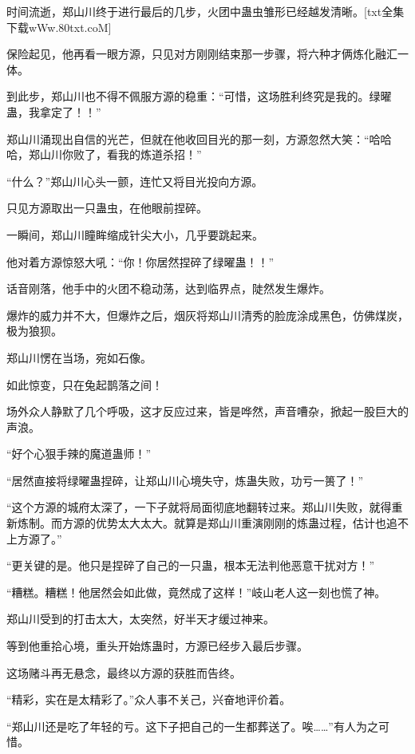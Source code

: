 
\begin{this_body}

时间流逝，郑山川终于进行最后的几步，火团中蛊虫雏形已经越发清晰。[txt全集下载wWw.80txt.coM]

保险起见，他再看一眼方源，只见对方刚刚结束那一步骤，将六种才俩炼化融汇一体。

到此步，郑山川也不得不佩服方源的稳重：“可惜，这场胜利终究是我的。绿曜蛊，我拿定了！！”

郑山川涌现出自信的光芒，但就在他收回目光的那一刻，方源忽然大笑：“哈哈哈，郑山川你败了，看我的炼道杀招！”

“什么？”郑山川心头一颤，连忙又将目光投向方源。

只见方源取出一只蛊虫，在他眼前捏碎。

一瞬间，郑山川瞳眸缩成针尖大小，几乎要跳起来。

他对着方源惊怒大吼：“你！你居然捏碎了绿曜蛊！！”

话音刚落，他手中的火团不稳动荡，达到临界点，陡然发生爆炸。

爆炸的威力并不大，但爆炸之后，烟灰将郑山川清秀的脸庞涂成黑色，仿佛煤炭，极为狼狈。

郑山川愣在当场，宛如石像。

如此惊变，只在兔起鹊落之间！

场外众人静默了几个呼吸，这才反应过来，皆是哗然，声音嘈杂，掀起一股巨大的声浪。

“好个心狠手辣的魔道蛊师！”

“居然直接将绿曜蛊捏碎，让郑山川心境失守，炼蛊失败，功亏一篑了！”

“这个方源的城府太深了，一下子就将局面彻底地翻转过来。郑山川失败，就得重新炼制。而方源的优势太大太大。就算是郑山川重演刚刚的炼蛊过程，估计也追不上方源了。”

“更关键的是。他只是捏碎了自己的一只蛊，根本无法判他恶意干扰对方！”

“糟糕。糟糕！他居然会如此做，竟然成了这样！”岐山老人这一刻也慌了神。

郑山川受到的打击太大，太突然，好半天才缓过神来。

等到他重拾心境，重头开始炼蛊时，方源已经步入最后步骤。

这场赌斗再无悬念，最终以方源的获胜而告终。

“精彩，实在是太精彩了。”众人事不关己，兴奋地评价着。

“郑山川还是吃了年轻的亏。这下子把自己的一生都葬送了。唉……”有人为之可惜。


\end{this_body}
